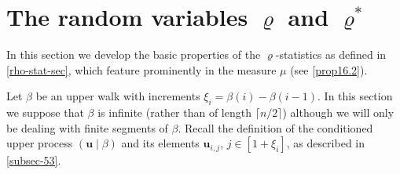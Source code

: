 \documentclass[11pt,reqno]{amsart}
\numberwithin{equation}{section}
\theoremstyle{definition}
\theoremstyle{remark}
\newcommand{\mbf}{\mathbf}
\begin{document}
\section{The random variables \texorpdfstring{$\varrho$}{} and \texorpdfstring{$\varrho^*$}{}}\label{rho-sec}

In this section we develop the basic properties of the $\varrho$-statistics as defined in \cref{rho-stat-sec}, which feature prominently in the measure $\mu$ (see \cref{prop16.2}). 
 
Let $\beta$ be an upper walk with increments $\xi_i = \beta(i) - \beta(i-1)$. In this section we suppose that $\beta$ is infinite (rather than of length $\lceil n/2\rceil$) although we will only be dealing with finite segments of $\beta$. Recall the definition of the conditioned upper process $(\mbf{u} \mid \beta)$ and its elements $\mbf{u}_{i,j}$, $j \in [1 + \xi_i]$, as described in \cref{subsec-53}.
\end{document}
